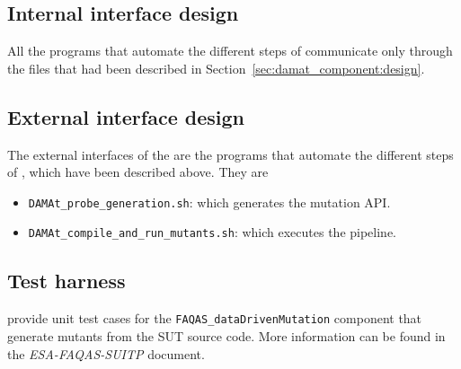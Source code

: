 \subsection{Internal interface design}



All the programs that automate the different steps of \MASS communicate only through the files that had been described in Section~\ref{sec:damat_component:design}.

\subsection{External interface design}

The external interfaces of the \MASS are the programs that automate the different steps of \MASS, which have been described above. They are

\begin{itemize}
  \item \texttt{DAMAt\_probe\_generation.sh}: which generates the mutation API.
	\item \texttt{DAMAt\_compile\_and\_run\_mutants.sh}: which executes the \dama pipeline.
\end{itemize}

\subsection{Test harness}

\dama provide unit test cases for the \texttt{FAQAS\_dataDrivenMutation} component that generate mutants from the SUT source code. More information can be found in the \textit{ESA-FAQAS-SUITP} document.
